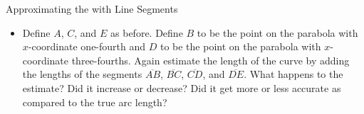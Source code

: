 \begin{exercise}{Approximating the  with Line Segments \Coffeecup \Coffeecup }
\begin{itemize}
{\begin{center}
\end{center}
The length is
$$
\sqrt{\left(\frac{1}{2}\right)^2+\left(\frac{1}{4}\right)^2}+\sqrt{\left(\frac{1}{2}\right)^2+\left(\frac{3}{4}\right)^2}
= \sqrt{\frac{1}{4}+\frac{1}{16}}+\sqrt{\frac{1}{4}+\frac{9}{16}}
= \sqrt{\frac{5}{16}}+\sqrt{\frac{13}{16}}
= \frac{\sqrt{5}+\sqrt{13}}{4}
$$
This is approximately $\frac{5.84}{4}\approx1.46$, which is slightly longer than $\sqrt{2}\approx1.41$. This makes sense, since the extra leg means the two paths cover more distance than the single path.\\
}{0in}

\item Define $A$, $C$, and $E$ as before.  Define $B$ to be the point on the parabola with $x$-coordinate one-fourth and $D$ to be the point on the parabola with $x$-coordinate three-fourths.  Again estimate the length of the curve by adding the lengths of the segments  $\overline{AB}$, $\overline{BC}$, $\overline{CD}$, and  $\overline{DE}$.  What happens to the estimate?  Did it increase or decrease?  Did it get more or less accurate as compared to the true arc length?


\end{itemize}
\end{exercise}
